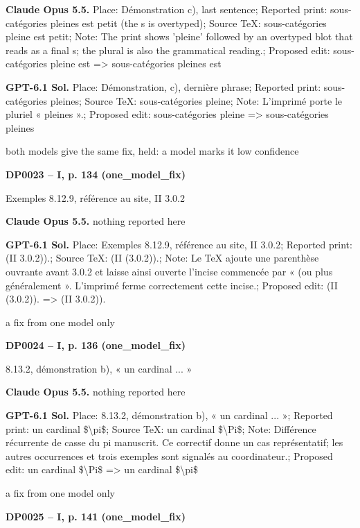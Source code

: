 \textbf{Claude Opus 5.5.} Place: Démonstration c), last sentence; Reported print: sous-catégories pleines est petit (the s is overtyped); Source TeX: sous-catégories pleine est petit; Note: The print shows 'pleine' followed by an overtyped blot that reads as a final s; the plural is also the grammatical reading.; Proposed edit: sous-catégories pleine est =\allowbreak > sous-catégories pleines est\par
\textbf{GPT-6.1 Sol.} Place: Démonstration, c), dernière phrase; Reported print: sous-catégories pleines; Source TeX: sous-catégories pleine; Note: L'imprimé porte le pluriel « pleines ».; Proposed edit: sous-catégories pleine =\allowbreak > sous-catégories pleines\par
both models give the same fix, held: a model marks it low confidence\par
\par\noindent\hypertarget{DP0023}{}\textbf{DP0023 -- I, p. 134 (one\_model\_fix)}\par
Exemples 8.12.9, référence au site, II 3.0.2\par
\textbf{Claude Opus 5.5.} nothing reported here\par
\textbf{GPT-6.1 Sol.} Place: Exemples 8.12.9, référence au site, II 3.0.2; Reported print: (II 3.0.2)).; Source TeX: (II (3.0.2)).; Note: Le TeX ajoute une parenthèse ouvrante avant 3.0.2 et laisse ainsi ouverte l'incise commencée par « (ou plus généralement ». L'imprimé ferme correctement cette incise.; Proposed edit: (II (3.0.2)). =\allowbreak > (II 3.0.2)).\par
a fix from one model only\par
\par\noindent\hypertarget{DP0024}{}\textbf{DP0024 -- I, p. 136 (one\_model\_fix)}\par
8.13.2, démonstration b), « un cardinal ... »\par
\textbf{Claude Opus 5.5.} nothing reported here\par
\textbf{GPT-6.1 Sol.} Place: 8.13.2, démonstration b), « un cardinal ... »; Reported print: un cardinal \$\textbackslash{}pi\$; Source TeX: un cardinal \$\textbackslash{}Pi\$; Note: Différence récurrente de casse du pi manuscrit. Ce correctif donne un cas représentatif; les autres occurrences et trois exemples sont signalés au coordinateur.; Proposed edit: un cardinal \$\textbackslash{}Pi\$ =\allowbreak > un cardinal \$\textbackslash{}pi\$\par
a fix from one model only\par
\par\noindent\hypertarget{DP0025}{}\textbf{DP0025 -- I, p. 141 (one\_model\_fix)}\par
